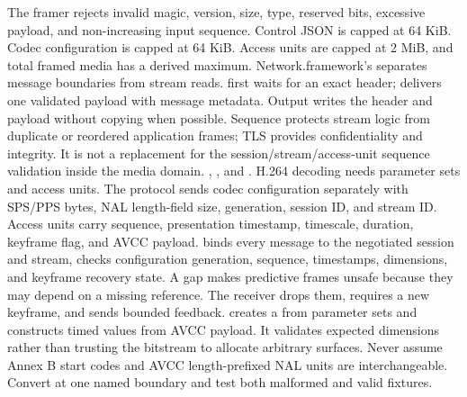 {}The framer rejects invalid magic, version, size, type, reserved bits, excessive payload, and non-increasing input sequence. Control JSON is capped at 64 KiB. Codec configuration is capped at 64 KiB. Access units are capped at 2 MiB, and total framed media has a derived maximum.\markdownRendererParagraphSeparator
{}Network.framework's  separates message boundaries from stream reads.  first waits for an exact header;  delivers one validated payload with message metadata. Output writes the header and payload without copying when possible.\markdownRendererParagraphSeparator
{}Sequence protects stream logic from duplicate or reordered application frames; TLS provides confidentiality and integrity. It is not a replacement for the session/stream/access-unit sequence validation inside the media domain.\markdownRendererInterblockSeparator
{}
\markdownRendererSectionEnd \markdownRendererSectionBegin
{}\markdownRendererInterblockSeparator
{}\markdownRendererBlockQuoteBegin
{} , , and .\markdownRendererBlockQuoteEnd \markdownRendererInterblockSeparator
{}H.264 decoding needs parameter sets and access units. The protocol sends codec configuration separately with SPS/PPS bytes, NAL length-field size, generation, session ID, and stream ID. Access units carry sequence, presentation timestamp, timescale, duration, keyframe flag, and AVCC payload.\markdownRendererParagraphSeparator
{} binds every message to the negotiated session and stream, checks configuration generation, sequence, timestamps, dimensions, and keyframe recovery state. A gap makes predictive frames unsafe because they may depend on a missing reference. The receiver drops them, requires a new keyframe, and sends bounded feedback.\markdownRendererParagraphSeparator
{} creates a  from parameter sets and constructs timed  values from AVCC payload. It validates expected dimensions rather than trusting the bitstream to allocate arbitrary surfaces.\markdownRendererParagraphSeparator
{}Never assume Annex B start codes and AVCC length-prefixed NAL units are interchangeable. Convert at one named boundary and test both malformed and valid fixtures.\markdownRendererInterblockSeparator
